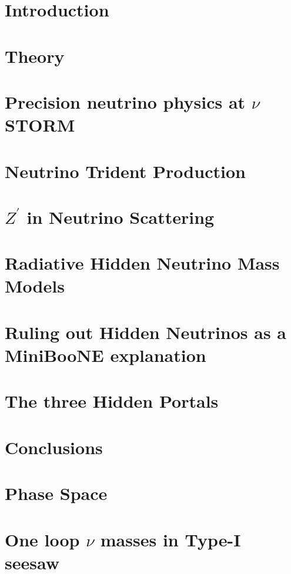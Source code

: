 \documentclass[twoside,openright,frontopenright]{ip3thesis}
\begin{document}
\chapter{Introduction}


\chapter{Theory}
%

\chapter{Precision neutrino physics at $\nu$STORM}
%

\chapter{Neutrino Trident Production}
%

\chapter{$Z^\prime$ in Neutrino Scattering}


\chapter{Radiative Hidden Neutrino Mass Models}


\chapter{Ruling out Hidden Neutrinos as a MiniBooNE explanation}


\chapter{The three Hidden Portals}


\chapter{Conclusions}


\appendix
\chapter{Phase Space}

\chapter{One loop $\nu$ masses in Type-I seesaw}




\end{document}
